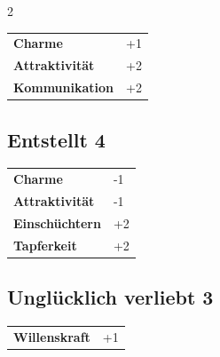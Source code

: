 \begin{multicols}{2}
\begin{tcolorbox}
\begin{tabular}{@{}ll@{}}
    \textbf{Charme} & +1\\
    \textbf{Attraktivität} & +2\\
    \textbf{Kommunikation} & +2\\
\end{tabular}


\end{tcolorbox}

\begin{tcolorbox}
    \subsection*{Entstellt \hfill \small{4 }}
    \tcblower




\begin{tabular}{@{}ll@{}}
    \textbf{Charme} & -1\\
    \textbf{Attraktivität} & -1\\
    \textbf{Einschüchtern} & +2\\
    \textbf{Tapferkeit} & +2\\
\end{tabular}


\end{tcolorbox}

\begin{tcolorbox}
    \subsection*{Unglücklich verliebt \hfill \small{3 }}
    \tcblower




\begin{tabular}{@{}ll@{}}
    \textbf{Willenskraft} & +1\\
\end{tabular}


\end{tcolorbox}


\end{multicols}
